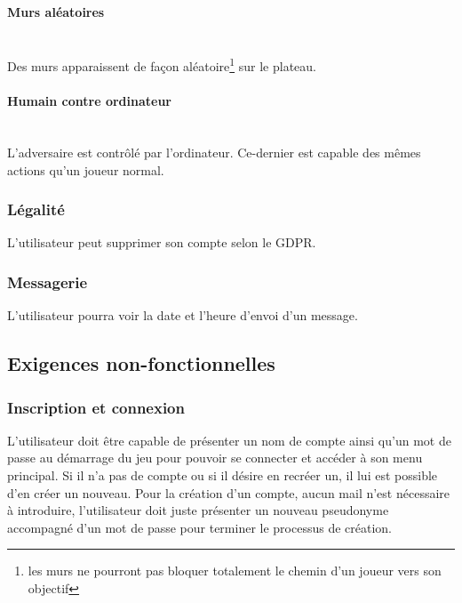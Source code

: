 \documentclass[french, utf8]{article}
\begin{document}
\paragraph{Murs aléatoires}
\\Des murs apparaissent de façon aléatoire\footnote{les murs ne pourront pas bloquer totalement le chemin d'un joueur vers son objectif} sur le plateau.
\paragraph{Humain contre ordinateur}
\\L'adversaire est contrôlé par l'ordinateur. Ce-dernier est capable des mêmes actions qu'un joueur normal.

\newpage
\subsubsection{Légalité}
L'utilisateur peut supprimer son compte selon le GDPR.

\subsubsection{Messagerie}
L'utilisateur pourra voir la date et l'heure d'envoi d'un message.

\subsection{Exigences non-fonctionnelles}
\subsubsection{Inscription et connexion}
L'utilisateur doit être capable de présenter un nom de compte ainsi qu'un mot de passe au démarrage du jeu pour pouvoir se connecter et accéder à son menu principal. Si il n'a pas de compte ou si il désire en recréer un, il lui est possible d'en créer un nouveau. Pour la création d'un compte, aucun mail n'est nécessaire à introduire, l'utilisateur doit juste présenter un nouveau pseudonyme accompagné d'un mot de passe pour terminer le processus de création. \newline
\end{document}
